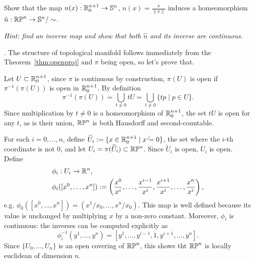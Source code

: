 \begin{example}
  \begin{exercise}
    Show that the map $n(x): \mathbb{R}^{n+1}_0\to \mathbb{S}^n$, $n(x) = \frac{x}{\|x\|}$ induces a homeomorphism $\hat n:\mathbb{RP}^n \to \mathbb{S}^n/\sim$.

    \textit{\small Hint: find an inverse map and show that both $\hat n$ and its inverse are continuous.}
  \end{exercise}

  .
  The structure of topological manifold follows immediately from the Theorem~\ref{thm:openproj} and $\pi$ being open, so let's prove that.

  Let $U\subset\mathbb{R}_0^{n+1}$, since $\pi$ is continuous by construction, $\pi(U)$ is open if $\pi^{-1}(\pi(U))$ is open in $\mathbb{R}^{n+1}_0$.
  By definition
  \begin{equation}
    \pi^{-1}(\pi(U)) = \bigcup_{t\neq 0} tU = \bigcup_{t\neq 0}\{tp \mid p\in U\}.
  \end{equation}
  Since multiplication by $t\neq 0$ is a homeomorphism of $\mathbb{R}_0^{n+1}$, the set $t U$ is open for any $t$, as is their union, $\mathbb{RP}^n$ is both Hausdorff and second-countable.

  For each $i=0,\ldots,n$, define $\widetilde U_i := \{x\in\mathbb{R}^{n+1}_0 \mid x^\neq0\}$, the set where the $i$-th coordinate is not $0$, and let $U_i = \pi(\widetilde U_i)\subset \mathbb{RP}^n$.
  Since $\widetilde U_i$ is open, $U_i$ is open.
  Define
  \begin{align}
    &\phi_i:U_i\to\mathbb{R}^n,\\
    &\phi_i([x^0, \ldots, x^n]):= \left(\frac{x^0}{x^i},\ldots,\frac{x^{i-1}}{x^i},\frac{x^{i+1}}{x^i},\ldots,\frac{x^n}{x^i}\right),
  \end{align}
  e.g. $\phi_0([x^0, \ldots, x^n]) = (x^1/x_0, \ldots, x^n/x_0)$.
  This map is well defined because its value is unchanged by multiplying $x$ by a non-zero constant.
  Moreover, $\phi_i$ is continuous: the inverses can be computed explicitly as
  \begin{equation}
    \phi_i^{-1}(y^1,\ldots,y^n) = \left[y^1, \ldots, y^{i-1}, 1, y^{i+1}, \ldots, y^n\right].
  \end{equation}
  Since $\{U_0, \ldots, U_n\}$ is an open covering of $\mathbb{RP}^n$, this shows tht $\mathbb{RP}^n$ is locally euclidean of dimension $n$.


\end{example}
